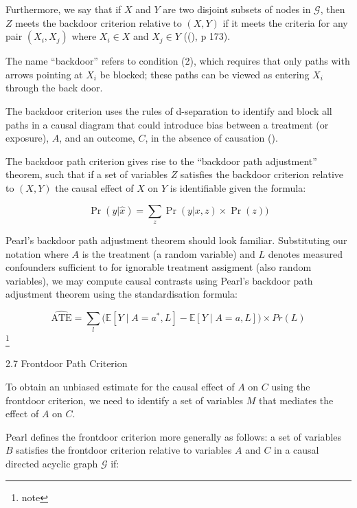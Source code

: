 \documentclass[
  single column]{article}
\makeatletter
\let\oldparagraph\paragraph
\renewcommand{\paragraph}{
    \@ifstar
      \xxxParagraphStar
      \xxxParagraphNoStar
  }
\newcommand{\xxxParagraphStar}[1]{\oldparagraph*{#1}\mbox{}}
\newcommand{\xxxParagraphNoStar}[1]{\oldparagraph{#1}\mbox{}}
\makeatother
\begin{document}
Furthermore, we say that if \(X\) and \(Y\) are two disjoint subsets of
nodes in \(\mathcal{G}\), then \(Z\) meets the backdoor criterion
relative to \((X, Y)\) if it meets the criteria for any pair
\((X_i, X_j)\) where \(X_i \in X\) and \(X_j \in Y\)
((), p 173).

The name ``backdoor'' refers to condition (2), which requires that only
paths with arrows pointing at \(X_i\) be blocked; these paths can be
viewed as entering \(X_i\) through the back door.

The backdoor criterion uses the rules of d-separation to identify and
block all paths in a causal diagram that could introduce bias between a
treatment (or exposure), \(A\), and an outcome, \(C\), in the absence of
causation ().

The backdoor path criterion gives rise to the ``backdoor path
adjustment'' theorem, such that if a set of variables \(Z\) satisfies
the backdoor criterion relative to \((X, Y)\) the causal effect of \(X\)
on \(Y\) is identifiable given the formula:

\[ \Pr(y|\hat{x}) = \sum_z \Pr(y|x,z) \times \Pr(z))\]

Pearl's backdoor path adjustment theorem should look familiar.
Substituting our notation where \(A\) is the treatment (a random
variable) and \(L\) denotes measured confounders sufficient to for
ignorable treatment assigment (also random variables), we may compute
causal contrasts using Pearl's backdoor path adjustment theorem using
the standardisation formula:

\[
\widehat{\text{ATE}} =  \sum_l \big( \mathbb{E}[Y \mid A = a^*, L] - \mathbb{E}[Y \mid A = a, L] \big) \times Pr(L)
\] \footnote{note}

\paragraph{2.7 Frontdoor Path Criterion}\label{frontdoor-path-criterion}

To obtain an unbiased estimate for the causal effect of \(A\) on \(C\)
using the frontdoor criterion, we need to identify a set of variables
\(M\) that mediates the effect of \(A\) on \(C\).

Pearl defines the frontdoor criterion more generally as follows: a set
of variables \(B\) satisfies the frontdoor criterion relative to
variables \(A\) and \(C\) in a causal directed acyclic graph
\(\mathcal{G}\) if:
\end{document}
